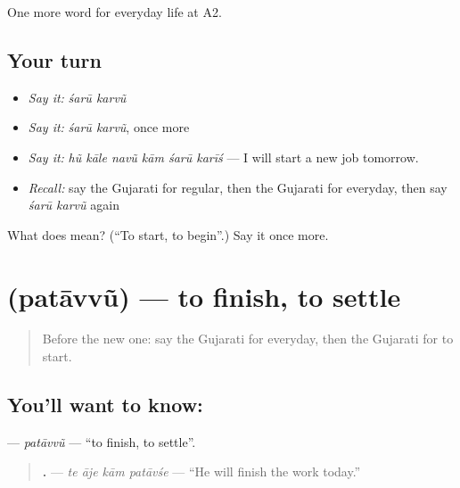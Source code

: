 \begin{grammarlens}[title={What you've built}]
One more word for everyday life at A2.
\end{grammarlens}

\subsection*{Your turn}
\begin{itemize}
\raggedright
  \item \emph{Say it:} \emph{śarū karvũ}
  \item \emph{Say it:} \emph{śarū karvũ}, once more
  \item \emph{Say it:} \emph{hũ kāle navũ kām śarū karīś} — I will start a new job tomorrow.
  \item \emph{Recall:} say the Gujarati for regular, then the Gujarati for everyday, then say \emph{śarū karvũ} again
\end{itemize}

\begin{tcolorbox}[breakable,colback=teal!4,colframe=teal!35!black,title={Before you move on}]
What does   mean? (\textquotedblleft{}To start, to begin\textquotedblright{}.) Say it once more.
\end{tcolorbox}
\section[\texorpdfstring{\gu{પતાવવું} (patāvvũ)}{પતાવવું (patāvvũ)}]{ (patāvvũ) — to finish, to settle}

\label{lesson:GU-C178-patavvu}



\begin{quote}
Before the new one: say the Gujarati for everyday, then the Gujarati for to start.
\end{quote}

\subsection*{You'll want to know: }
\textbf{} — \emph{patāvvũ} — \textquotedblleft{}to finish, to settle\textquotedblright{}.

\begin{quote}
\textbf{   .} — \emph{te āje kām patāvśe} — \textquotedblleft{}He will finish the work today.\textquotedblright{}
\end{quote}

